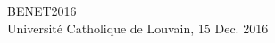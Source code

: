 \documentclass[12pt,a4paper]{article}
\begin{document}
\thispagestyle{empty}
  
\begin{center}
  {\huge BENET2016}\\
  {\large Université Catholique de Louvain, 15 Dec. 2016\\}

  \vfill
  
\end{center}

\vfill
\end{document}
